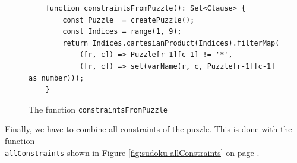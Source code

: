\begin{figure}[!ht]
\centering
\begin{verbatim}
    function constraintsFromPuzzle(): Set<Clause> {
        const Puzzle  = createPuzzle();
        const Indices = range(1, 9);    
        return Indices.cartesianProduct(Indices).filterMap(
            ([r, c]) => Puzzle[r-1][c-1] != '*',
            ([r, c]) => set(varName(r, c, Puzzle[r-1][c-1] as number)));
    }
\end{verbatim}
\vspace*{-0.3cm}
\caption{The function \texttt{constraintsFromPuzzle}}
\label{fig:sudoku-constraintsFromPuzzle}
\end{figure}

Finally, we have to combine all constraints of the puzzle.  This is done with the function \\
\texttt{allConstraints} shown in Figure \ref{fig:sudoku-allConstraints} on page \pageref{fig:sudoku-allConstraints}.


